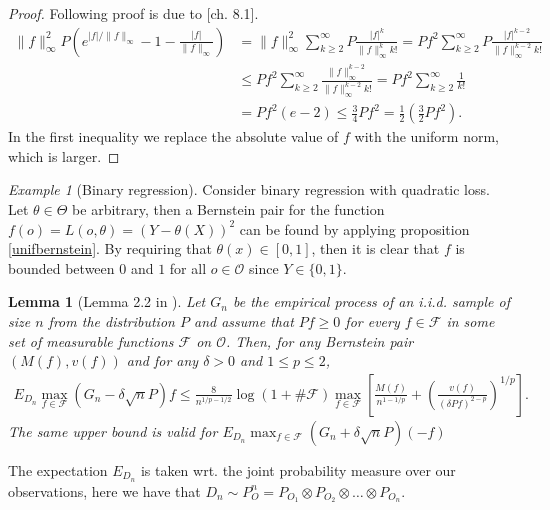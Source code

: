\documentclass[11pt, a4paper]{article}
\newcommand\norm[1]{\lVert#1\rVert}
\newtheorem{lemma}[theorem]{Lemma}
\theoremstyle{definition}
\theoremstyle{remark}
\newtheorem{example}{Example}
\newcommand{\btheta}{\theta}
\begin{document}
\begin{proof}
    Following proof is due to \parencite{vaart06}[ch. 8.1]. 
    \begin{align*}
        \norm{f}_{\infty}^2 P\left( e^{|f|/\norm{f}_{\infty}} -1 - \frac{|f|}{\norm{f}_{\infty}}\right) &= \norm{f}_{\infty}^{2} \sum_{k \geq 2}^{\infty} P \frac{|f|^{k}}{\norm{f}^{k}_{\infty}k!} = Pf^2 \sum_{k \geq 2}^{\infty} P\frac{|f|^{k-2}}{\norm{f}^{k-2}_{\infty} k! } \\
                                                                                                        &\leq P f^2 \sum_{k \geq 2}^{\infty} \frac{\norm{f}_{\infty}^{k-2}}{\norm{f}^{k-2}_{\infty} k! } = P f^2 \sum_{k \geq 2}^{\infty} \frac{1}{k !}\\
                                                                                                        &= P f^2 (e-2)\leq \frac{3}{4} P f^2 = \frac{1}{2} \left(\frac{3}{2} Pf^2\right). 
    \end{align*}
   In the first inequality we replace the absolute value of $ f $ with the uniform norm, which is larger. 
\end{proof}

\begin{example}[Binary regression]
    Consider binary regression with quadratic loss. Let $ \btheta \in \Theta $ be arbitrary, then a Bernstein pair for the function $ f(o) = L(o, \btheta) = (Y - \theta(X))^2$ can be found by applying proposition \ref{unifbernstein}. By requiring that $ \theta(x) \in [0,1] $, then it is clear that $ f $ is bounded between $ 0 $ and $ 1 $ for all $ o \in \mathcal{O} $ since $ Y \in \{0,1\} $.  

\end{example}


\begin{lemma}[Lemma 2.2 in \parencite{vaart06}] \label{finitesamplebound}
    Let $G_{n}$ be the empirical process of an i.i.d. sample of size $n$ from the distribution $P$ and assume that $P f \geq 0$ for every $f \in \mathcal{F}$ in some set of measurable functions $ \mathcal{F} $ on $ \mathcal{O} $. Then, for any Bernstein pair $(M(f), v(f))$ and for any $\delta>0$ and $1 \leq p \leq 2$,
    \begin{align*}
        E_{D_n} \max_{f \in \mathcal{F}}(G_n-\delta \sqrt{n} P) f \leq \frac{8}{n^{1 / p-1 / 2}} \log (1+\# \mathcal{F}) \max _{f \in \mathcal{F}}\left[\frac{M(f)}{n^{1-1 / p}}+\left(\frac{v(f)}{(\delta P f)^{2-p}}\right)^{1 / p}\right].
    \end{align*}
    The same upper bound is valid for $ E_{D_n} \max_{f \in \mathcal{F}}(G_n+\delta \sqrt{n} P)(-f) $  
\end{lemma}
The expectation $ E_{D_n} $ is taken wrt. the joint probability measure over our observations, here we have that $ D_n \sim P_{O}^{n} = P_{O_1} \otimes P_{O_2} \otimes \dots \otimes P_{O_n} $. 
\end{document}
